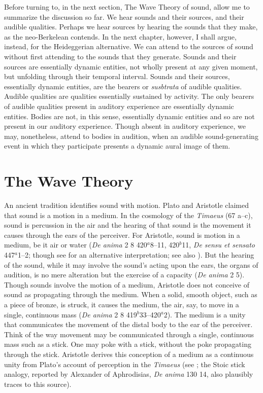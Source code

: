 Before turning to, in the next section, The Wave Theory of sound, allow me to summarize the discussion so far. We hear sounds and their sources, and their audible qualities. Perhaps we hear sources by hearing the sounds that they make, as the neo-Berkelean contends. In the next chapter, however, I shall argue, instead, for the Heideggerian alternative. We can attend to the sources of sound without first attending to the sounds that they generate. Sounds and their sources are essentially dynamic entities, not wholly present at any given moment, but unfolding through their temporal interval. Sounds and their sources, essentially dynamic entities, are the bearers or \emph{susbtrata} of audible qualities. Audible qualities are qualities essentially sustained by activity. The only bearers of audible qualities present in auditory experience are essentially dynamic entities. Bodies are not, in this sense, essentially dynamic entities and so are not present in our auditory experience. Though absent in auditory experience, we may, nonetheless, attend to bodies in audition, when an audible sound-generating event in which they participate presents a dynamic aural image of them.



\section{The Wave Theory} %
\label{sec:the_wave_theory}

An ancient tradition identifies sound with motion. Plato and Aristotle claimed that sound is a motion in a medium. In the cosmology of the \emph{Timaeus} (67 a--c), sound is percussion in the air and the hearing of that sound is the movement it causes through the ears of the perceiver. For Aristotle, sound is motion in a medium, be it air or water (\emph{De anima} 2 8 420\( ^{a} \)8--11, 420\( ^{b} \)11, \emph{De sensu et sensato} 447\( ^{a} \)1--2; though see \citealt[60--1]{OCallaghan:2007xy} for an alternative interpretation; see also \citealt{Johnstone:2013la}). But the hearing of the sound, while it may involve the sound's acting upon the ears, the organs of audition, is no mere alteration but the exercise of a capacity (\emph{De anima} 2 5). Though sounds involve the motion of a medium, Aristotle does not conceive of sound as propagating through the medium. When a solid, smooth object, such as a piece of bronze, is struck, it causes the medium, the air, say, to move in a single, continuous mass (\emph{De anima} 2 8 419\( ^{b} \)33--420\( ^{a} \)2). The medium is a unity that communicates the movement of the distal body to the ear of the perceiver. Think of the way movement may be communicated through a single, continuous mass such as a stick. One may poke with a stick, without the poke propagating through the stick. Aristotle derives this conception of a medium as a continuous unity from Plato's account of perception in the \emph{Timaeus} (see \citealt[chapter 1]{Lindberg:1977aa}; the Stoic stick analogy, reported by Alexander of Aphrodisias, \emph{De anima} 130 14, also plausibly traces to this source). 

